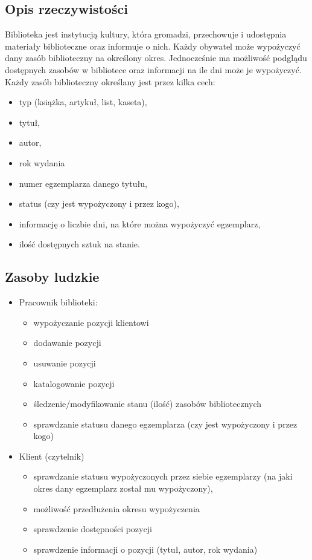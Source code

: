 \subsection{Opis rzeczywistości}
Biblioteka jest instytucją kultury, która gromadzi, przechowuje i udostępnia materiały biblioteczne oraz 
informuje o nich. Każdy obywatel może wypożyczyć dany zasób biblioteczny na określony okres. 
Jednocześnie ma możliwość podglądu dostępnych zasobów w bibliotece oraz informacji na ile dni może je wypożyczyć. 
Każdy zasób biblioteczny określany jest przez kilka cech: 
\begin{itemize}
    \item typ (książka, artykuł, list, kaseta), 
    \item tytuł,
    \item autor,
    \item rok wydania
    \item numer egzemplarza danego tytułu, 
    \item status (czy jest wypożyczony i przez kogo), 
    \item informację o liczbie dni, na które można wypożyczyć egzemplarz,
    \item ilość dostępnych sztuk na stanie.
\end{itemize}

\subsection{Zasoby ludzkie}
\begin{itemize}
    \item Pracownik biblioteki:
    \begin{itemize}
        \item wypożyczanie pozycji klientowi
        \item dodawanie pozycji
        \item usuwanie pozycji
        \item katalogowanie pozycji
        \item śledzenie/modyfikowanie stanu (ilość) zasobów bibliotecznych
        \item sprawdzanie statusu danego egzemplarza (czy jest wypożyczony i przez kogo)
    \end{itemize}
    \item Klient (czytelnik)
    \begin{itemize}
        \item sprawdzanie statusu wypożyczonych przez siebie egzemplarzy (na jaki okres dany egzemplarz został mu wypożyczony),
        \item możliwość przedłużenia okresu wypożyczenia
        \item sprawdzenie dostępności pozycji
        \item sprawdzenie informacji o pozycji (tytuł, autor, rok wydania)
    \end{itemize}
\end{itemize}

